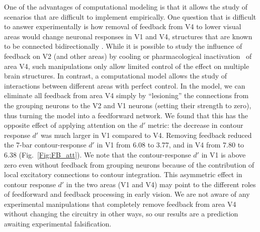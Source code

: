 One of the advantages of computational modeling is that it allows the
study of scenarios that are difficult to implement empirically.
One question that is difficult to answer experimentally is how removal of
feedback from V4 to lower visual areas
would change neuronal responses in V1 and V4, structures that
are known to be connected bidirectionally
\citep{Zeki78b,Ungerleider_etal07}.
While it is possible to study the influence of feedback on V2 (and
other areas) by cooling \citep{Hupe_etal98} or pharmacological
inactivation~\citep{Jansen-Amorim_etal12} 
of area V4, such manipulations only
allow limited control of the effect on multiple brain structures. In
contrast, a computational model allows the study of interactions
between different areas with perfect control. In the model, 
we can eliminate all feedback from area V4 simply by ``lesioning'' the
connections from the grouping neurons to the V2 and V1 neurons
(setting their strength to zero), thus turning the model into a
feedforward network.  We found that this has the opposite effect of
applying attention on the $d'$ metric: the decrease in contour
response $d'$ was much larger in V1 compared to V4. Removing feedback
reduced the 7-bar contour-response $d'$ in V1 from 6.08 to 3.77, and
in V4 from 7.80 to 6.38 (Fig.~\ref{Fig:FB_att}). We note that the
contour-response $d'$ in V1 is above zero even without feedback from
grouping neurons because of the contribution of local excitatory
connections to contour integration.  This asymmetric effect in contour
response $d'$ in the two areas (V1 and V4) may point to the different
roles of feedforward and feedback processing in early vision. We are
not aware of any experimental manipulations that completely remove
feedback from area V4 without changing the circuitry in other ways, so
our results are a prediction awaiting experimental falsification.

